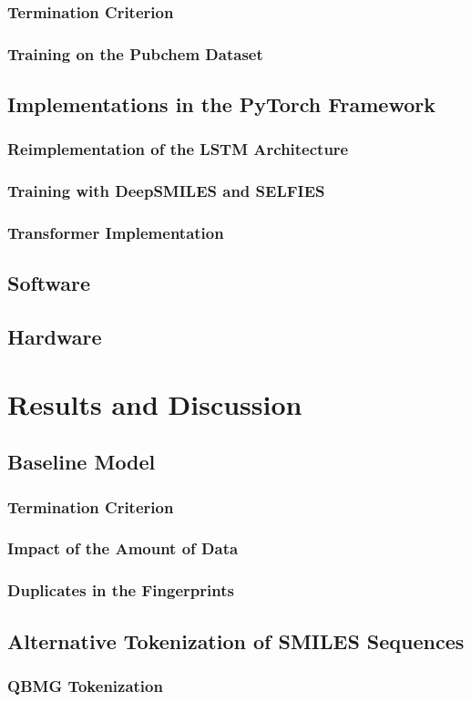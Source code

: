 \documentclass[12pt,a4paper]{report}
\begin{document}
\subsection{Termination Criterion}
\subsection{Training on the Pubchem Dataset}

\section{Implementations in the PyTorch Framework}
\subsection{Reimplementation of the LSTM Architecture}
\subsection{Training with DeepSMILES and SELFIES}
\subsection{Transformer Implementation}

\section{Software}
\section{Hardware}

\chapter{Results and Discussion}
\section{Baseline Model}
\subsection{Termination Criterion}
\subsection{Impact of the Amount of Data}
\subsection{Duplicates in the Fingerprints}

\section{Alternative Tokenization of SMILES Sequences}
\subsection{QBMG Tokenization}
\end{document}
